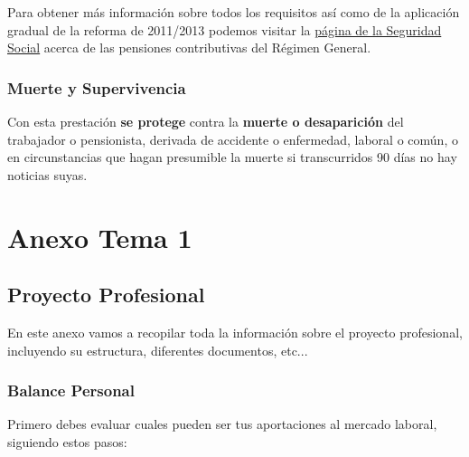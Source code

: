 Para obtener más información sobre todos los requisitos así como de la aplicación gradual de la reforma de 2011/2013 podemos visitar la \href{https://www.seg-social.es/wps/portal/wss/internet/Trabajadores/PrestacionesPensionesTrabajadores/10963/28393/28396}{página de la Seguridad Social} acerca de las pensiones contributivas del Régimen General.

\subsection{Muerte y Supervivencia}
Con esta prestación \textbf{se protege} contra la \textbf{muerte o desaparición} del trabajador o pensionista, derivada de accidente o enfermedad, laboral o común, o en circunstancias que hagan presumible la muerte si transcurridos 90 días no hay noticias suyas.



\chapter{Anexo Tema 1}

\section{Proyecto Profesional}
En este anexo vamos a recopilar toda la información sobre el proyecto profesional, incluyendo su estructura, diferentes documentos, etc...

\subsection{Balance Personal}
Primero debes evaluar cuales pueden ser tus aportaciones al mercado laboral, siguiendo estos pasos:

